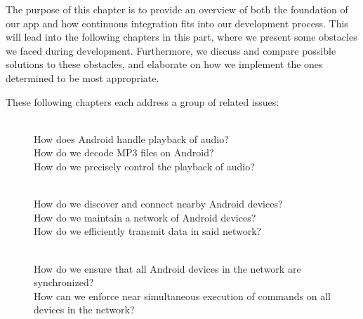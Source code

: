 The purpose of this chapter is to provide an overview of both the foundation of our app and how continuous integration fits into our development process.
This will lead into the following chapters in this part, where we present some obstacles we faced during development.
Furthermore, we discuss and compare possible solutions to these obstacles, and elaborate on how we implement the ones determined to be most appropriate.

These following chapters each address a group of related issues:
\begin{description}
    \item[] \hfill\\
        How does Android handle playback of audio?\\
        How do we decode MP3 files on Android?\\
        How do we precisely control the playback of audio?
    \item[] \hfill\\
        How do we discover and connect nearby Android devices?\\
        How do we maintain a network of Android devices?\\
        How do we efficiently transmit data in said network?
    \item[] \hfill\\
        How do we ensure that all Android devices in the network are synchronized?\\
        How can we enforce near simultaneous execution of commands on all devices in the network?
\end{description}
